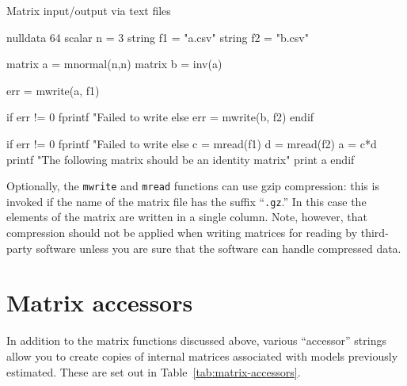 \begin{script}[htbp]
  \caption{Matrix input/output via text files}
  \label{matrix-rw}
  \begin{scode}
nulldata 64
scalar n = 3
string f1 = "a.csv"
string f2 = "b.csv"

matrix a = mnormal(n,n)
matrix b = inv(a)

err = mwrite(a, f1)

if err != 0
  fprintf "Failed to write %
else
  err = mwrite(b, f2)
endif 

if err != 0
  fprintf "Failed to write %
else
  c = mread(f1)
  d = mread(f2)
  a = c*d
  printf "The following matrix should be an identity matrix\n"
  print a
endif
  \end{scode}
\end{script}

Optionally, the \texttt{mwrite} and \texttt{mread} functions can use
gzip compression: this is invoked if the name of the matrix file has
the suffix ``\texttt{.gz}.'' In this case the elements of the matrix
are written in a single column. Note, however, that compression should
not be applied when writing matrices for reading by third-party
software unless you are sure that the software can handle compressed
data.

\section{Matrix accessors}
\label{matrix-accessors}

In addition to the matrix functions discussed above,
various ``accessor'' strings allow you to create copies of internal
matrices associated with models previously estimated.
These are set out in Table~\ref{tab:matrix-accessors}.

